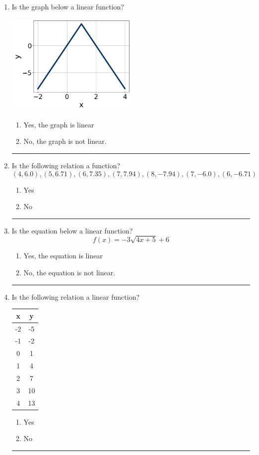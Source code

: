 \documentclass[14pt]{extbook}
\newcommand{\litem}[1]{\item#1\hspace*{-1cm}\rule{\textwidth}{0.4pt}}
\begin{document}
\begin{enumerate}
{\begin{enumerate}[label=\Alph*.]
\end{enumerate} }
\litem{
Is the graph below a linear function?
\begin{center}
    \includegraphics[width=0.5\textwidth]{../Figures/MA_8_F_1_2_graphG.png}
\end{center}
\begin{enumerate}[label=\Alph*.]
\item Yes, the graph is linear
\item No, the graph is not linear.

\end{enumerate} }
\litem{
Is the following relation a function?\[ (4, 6.0), (5, 6.71), (6, 7.35), (7, 7.94), (8, -7.94), (7, -6.0), (6, -6.71) \]\begin{enumerate}[label=\Alph*.]
\item Yes
\item No

\end{enumerate} }
\litem{
Is the equation below a linear function?\[ f(x) = {-3}\sqrt{4x + 5}+6 \]\begin{enumerate}[label=\Alph*.]
\item Yes, the equation is linear
\item No, the equation is not linear.

\end{enumerate} }
\litem{
Is the following relation a linear function?

\begin{tabular}{c|c}
x &y\tabularnewline \hline
-2 &-5\tabularnewline \hline
-1 &-2\tabularnewline \hline
0 &1\tabularnewline \hline
1 &4\tabularnewline \hline
2 &7\tabularnewline \hline
3 &10\tabularnewline \hline
4 &13\end{tabular}\begin{enumerate}[label=\Alph*.]
\item Yes
\item No


\end{enumerate}}
\end{enumerate}
\end{document}
